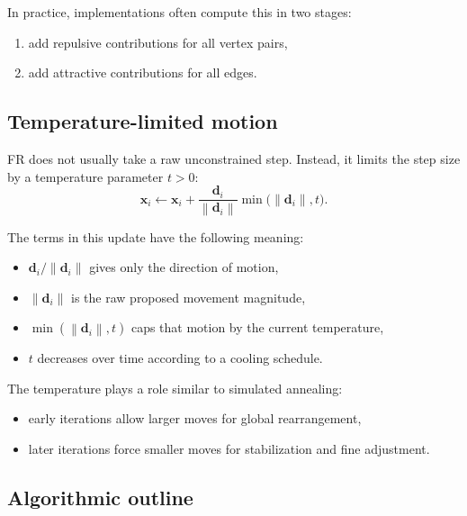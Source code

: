 \documentclass[11pt]{article}
\newcommand{\vect}[1]{\boldsymbol{#1}}
\newcommand{\norm}[1]{\left\lVert #1 \right\rVert}
\begin{document}
In practice, implementations often compute this in two stages:
\begin{enumerate}[leftmargin=1.5em]
\item add repulsive contributions for all vertex pairs,
\item add attractive contributions for all edges.
\end{enumerate}

\subsection{Temperature-limited motion}

FR does not usually take a raw unconstrained step. Instead, it limits the step
size by a temperature parameter $t > 0$:
\[
\vect{x}_i \leftarrow \vect{x}_i
+
\frac{\vect{d}_i}{\norm{\vect{d}_i}}
\min\!\bigl(\norm{\vect{d}_i}, t\bigr).
\]

The terms in this update have the following meaning:
\begin{itemize}[leftmargin=1.5em]
\item $\vect{d}_i / \norm{\vect{d}_i}$ gives only the direction of motion,
\item $\norm{\vect{d}_i}$ is the raw proposed movement magnitude,
\item $\min(\norm{\vect{d}_i}, t)$ caps that motion by the current temperature,
\item $t$ decreases over time according to a cooling schedule.
\end{itemize}

The temperature plays a role similar to simulated annealing:
\begin{itemize}[leftmargin=1.5em]
\item early iterations allow larger moves for global rearrangement,
\item later iterations force smaller moves for stabilization and fine adjustment.
\end{itemize}

\subsection{Algorithmic outline}
\end{document}
